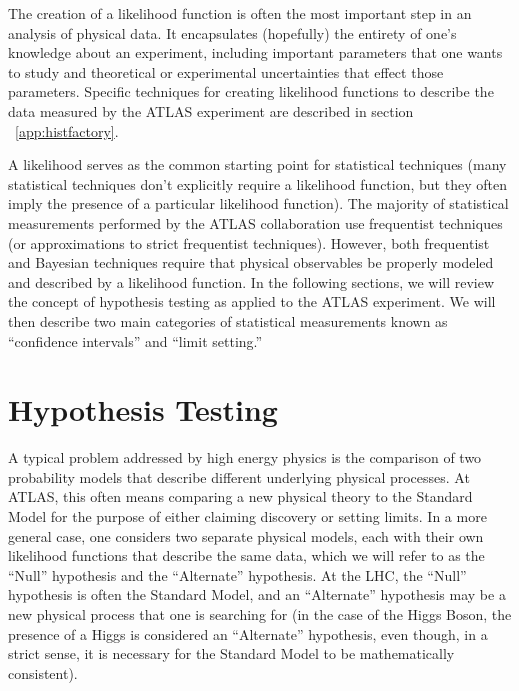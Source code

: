 
The creation of a likelihood function is often the most important step in an analysis of physical data.
It encapsulates (hopefully) the entirety of one's knowledge about an experiment, including important parameters that one wants to study and theoretical or experimental uncertainties that effect those parameters.
Specific techniques for creating likelihood functions to describe the data measured by the ATLAS experiment are described in section ~\ref{app:histfactory}.

A likelihood serves as the common starting point for statistical techniques (many statistical techniques don't explicitly require a likelihood function, but they often imply the presence of a particular likelihood function).
The majority of statistical measurements performed by the ATLAS collaboration use frequentist techniques (or approximations to strict frequentist techniques).
However, both frequentist and Bayesian techniques require that physical observables be properly modeled and described by a likelihood function.
In the following sections, we will review the concept of hypothesis testing as applied to the ATLAS experiment.
We will then describe two main categories of statistical measurements known as ``confidence intervals'' and ``limit setting.''


\section{Hypothesis Testing}
A typical problem addressed by high energy physics is the comparison of two probability models that describe different underlying physical processes.
At ATLAS, this often means comparing a new physical theory to the Standard Model for the purpose of either claiming discovery or setting limits.
In a more general case, one considers two separate physical models, each with their own likelihood functions that describe the same data, which we will refer to as the ``Null'' hypothesis and the ``Alternate'' hypothesis.
At the LHC, the ``Null'' hypothesis is often the Standard Model, and an ``Alternate'' hypothesis may be a new physical process that one is searching for (in the case of the Higgs Boson, the presence of a Higgs is considered an ``Alternate'' hypothesis, even though, in a strict sense, it is necessary for the Standard Model to be mathematically consistent).

